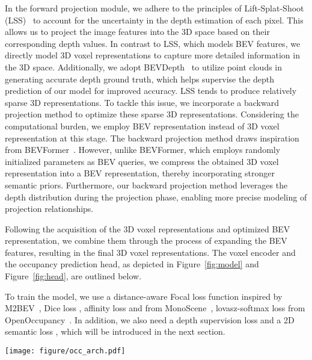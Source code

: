 \documentclass[10pt,twocolumn,letterpaper]{article}
\begin{document}
In the forward projection module, we adhere to the principles of Lift-Splat-Shoot (LSS)~\cite{philion2020lift} to account for the uncertainty in the depth estimation of each pixel. This allows us to project the image features into the 3D space based on their corresponding depth values. In contrast to LSS, which models BEV features, we directly model 3D voxel representations to capture more detailed information in the 3D space. Additionally, we adopt BEVDepth~\cite{li2023bevdepth} to utilize point clouds in generating accurate depth ground truth, which helps supervise the depth prediction of our model for improved accuracy. LSS tends to produce relatively sparse 3D representations. To tackle this issue, we incorporate a backward projection method to optimize these sparse 3D representations. Considering the computational burden, we employ BEV representation instead of 3D voxel representation at this stage. The backward projection method draws inspiration from BEVFormer~\cite{li2022bevformer}. However, unlike BEVFormer, which employs randomly initialized parameters as BEV queries, we compress the obtained 3D voxel representation into a BEV representation, thereby incorporating stronger semantic priors. Furthermore, our backward projection method leverages the depth distribution during the projection phase, enabling more precise modeling of projection relationships.


Following the acquisition of the 3D voxel representations and optimized BEV representation, we combine them through the process of expanding the BEV features, resulting in the final 3D voxel representations. The voxel encoder and the occupancy prediction head, as depicted in Figure~\ref{fig:model} and Figure~\ref{fig:head}, are outlined below.

To train the model, we use a distance-aware Focal loss function  inspired by M2BEV~\cite{xie2022m2bev}, Dice loss , affinity loss
 and  from MonoScene~\cite{cao2022monoscene}, lovasz-softmax loss  from OpenOccupancy~\cite{wang2023openoccupancy}. In addition, we also need a depth supervision loss  and a 2D semantic loss , which will be introduced in the next section.




\begin{figure*}[htb]
\centering
\texttt{[image: figure/occ\_arch.pdf]}
\vspace{-3mm}
\caption{\textbf{The overall architecture of FB-OCC.} F-VTM is based on forward projection (LSS), and B-VTM is based on backward projection (BEVFormer).
}
\label{fig:model}
\vspace{-3mm}
\end{figure*}
\end{document}
